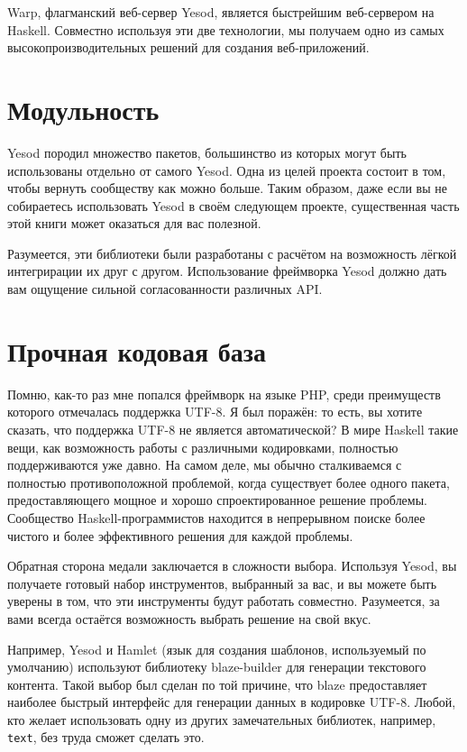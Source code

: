 Warp, флагманский веб-сервер Yesod, является быстрейшим веб-сервером на
Haskell. Совместно используя эти две технологии, мы получаем одно из самых
высокопроизводительных решений для создания веб-приложений.

\section{Модульность}

Yesod породил множество пакетов, большинство из которых могут быть использованы
отдельно от самого Yesod. Одна из целей проекта состоит в том, чтобы вернуть
сообществу как можно больше. Таким образом, даже если вы не собираетесь
использовать Yesod в своём следующем проекте, существенная часть этой книги
может оказаться для вас полезной.

Разумеется, эти библиотеки были разработаны с расчётом на возможность лёгкой
интегрирации их друг с другом. Использование фреймворка Yesod должно дать вам
ощущение сильной согласованности различных API.

\section{Прочная кодовая база}

Помню, как-то раз мне попался фреймворк на языке PHP, среди преимуществ
которого отмечалась поддержка UTF-8. Я был поражён: то есть, вы хотите сказать,
что поддержка UTF-8 не является автоматической? В мире Haskell такие вещи, как
возможность работы с различными кодировками, полностью поддерживаются уже
давно. На самом деле, мы обычно сталкиваемся с полностью противоположной
проблемой, когда существует более одного пакета, предоставляющего мощное и
хорошо спроектированное решение проблемы. Сообщество Haskell-программистов
находится в непрерывном поиске более чистого и более эффективного решения для
каждой проблемы.

Обратная сторона медали заключается в сложности выбора. Используя Yesod, вы
получаете готовый набор инструментов, выбранный за вас, и вы можете быть
уверены в том, что эти инструменты будут работать совместно. Разумеется, за
вами всегда остаётся возможность выбрать решение на свой вкус.

Например, Yesod и Hamlet (язык для создания шаблонов, используемый по
умолчанию) используют библиотеку blaze-builder для генерации текстового
контента. Такой выбор был сделан по той причине, что blaze предоставляет
наиболее быстрый интерфейс для генерации данных в кодировке UTF-8. Любой, кто
желает использовать одну из других замечательных библиотек, например,
\texttt{text}, без труда сможет сделать это.

